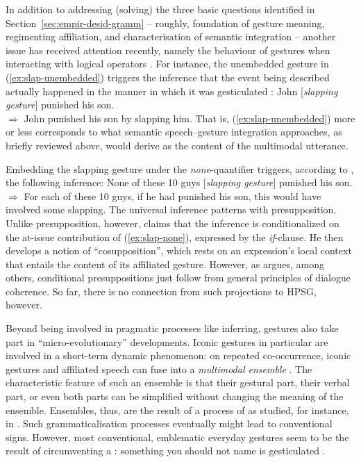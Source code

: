 \documentclass[output=paper
 	        ,biblatex
                ,babelshorthands
                ,newtxmath
                ,draftmode
                ,colorlinks, citecolor=brown
]{langscibook}
\begin{document}
In addition to addressing (solving) the three basic questions identified in Section~\ref{sec:empir-desid-gramm} -- roughly, foundation of gesture meaning, regimenting affiliation, and characterisation of semantic integration -- another issue has received attention recently, namely the  behaviour of gestures when interacting with logical operators \citep{Ebert:2014:a,Schlenker:2018}.
%
For instance, the unembedded gesture in (\ref{ex:slap-unembedded}) triggers the inference that the event being described actually happened in the manner in which it was gesticulated \citep[]{Schlenker:2018}:
%
\ea \label{ex:slap-unembedded}
John [\textit{slapping gesture}] punished his son. \\
$\Rightarrow$ John punished his son by slapping him.
\z
%
That is, (\ref{ex:slap-unembedded}) more or less corresponds to what semantic speech--gesture integration approaches, as briefly reviewed above, would derive as the content of the multimodal utterance.

Embedding the slapping gesture under the \textit{none}-quantifier triggers, according to \citet[]{Schlenker:2018}, the following inference:
%
\ea \label{ex:slap-none}
None of these 10 guys [\textit{slapping gesture}] punished his son. \\
$\Rightarrow$ For each of these 10 guys, if he had punished his son, this would have involved some slapping.
\z
%
The universal inference patterns with presupposition.
%
Unlike presupposition, however, \citet[]{Schlenker:2018} claims that the inference is conditionalized on the at-issue contribution of (\ref{ex:slap-none}), expressed by the \textit{if}-clause. 
%
He then develops a notion of \enquote{cosupposition}, which rests on an expression's local context that entails the content of its affiliated gesture.
%
However, as \citet{Hunter:2019} argues, among others, conditional presuppositions just follow from general principles of dialogue coherence.
%
So far, there is no connection from such projections to HPSG, however.


Beyond being involved in pragmatic processes like inferring, gestures also take part in \enquote{micro-evolutionary} developments.
%
Iconic gestures in particular are involved in a short-term dynamic phenomenon:
%
on repeated co-occurrence, iconic gestures and affiliated speech can fuse into a \emph{multimodal ensemble} \citep{Kendon:2004,Luecking:Mehler:Menke:2008,Mehler:Luecking:2012:d}.
%
The characteristic feature of such an ensemble is that their gestural part, their verbal part, or even both parts can be simplified without changing the meaning of the ensemble.
%
Ensembles, thus, are the result of a process of  as studied, for instance, in  \citep{Galantucci:Garrod:2011}.
%
Such grammaticalisation processes eventually might lead to conventional signs.
%
However, most conventional, emblematic everyday gestures seem to be the result of circumventing a : something you should not name is gesticulated \citep{Posner:2002}.
\end{document}
